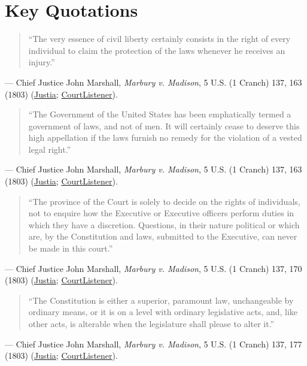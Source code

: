 \documentclass[12pt]{article}
\begin{document}
\section{Key Quotations}

\begin{quote}
``The very essence of civil liberty certainly consists in the right of every individual to claim the protection of the laws whenever he receives an injury.''
\end{quote}
\noindent --- Chief Justice John Marshall, \textit{Marbury v. Madison}, 5 U.S. (1 Cranch) 137, 163 (1803) (\href{https://supreme.justia.com/cases/federal/us/5/137/}{Justia}; \href{https://www.courtlistener.com/opinion/84759/marbury-v-madison/}{CourtListener}).

\begin{quote}
``The Government of the United States has been emphatically termed a government of laws, and not of men. It will certainly cease to deserve this high appellation if the laws furnish no remedy for the violation of a vested legal right.''
\end{quote}
\noindent --- Chief Justice John Marshall, \textit{Marbury v. Madison}, 5 U.S. (1 Cranch) 137, 163 (1803) (\href{https://supreme.justia.com/cases/federal/us/5/137/}{Justia}; \href{https://www.courtlistener.com/opinion/84759/marbury-v-madison/}{CourtListener}).

\begin{quote}
``The province of the Court is solely to decide on the rights of individuals, not to enquire how the Executive or Executive officers perform duties in which they have a discretion. Questions, in their nature political or which are, by the Constitution and laws, submitted to the Executive, can never be made in this court.''
\end{quote}
\noindent --- Chief Justice John Marshall, \textit{Marbury v. Madison}, 5 U.S. (1 Cranch) 137, 170 (1803) (\href{https://supreme.justia.com/cases/federal/us/5/137/}{Justia}; \href{https://www.courtlistener.com/opinion/84759/marbury-v-madison/}{CourtListener}).

\begin{quote}
``The Constitution is either a superior, paramount law, unchangeable by ordinary means, or it is on a level with ordinary legislative acts, and, like other acts, is alterable when the legislature shall please to alter it.''
\end{quote}
\noindent --- Chief Justice John Marshall, \textit{Marbury v. Madison}, 5 U.S. (1 Cranch) 137, 177 (1803) (\href{https://supreme.justia.com/cases/federal/us/5/137/}{Justia}; \href{https://www.courtlistener.com/opinion/84759/marbury-v-madison/}{CourtListener}).
\end{document}
